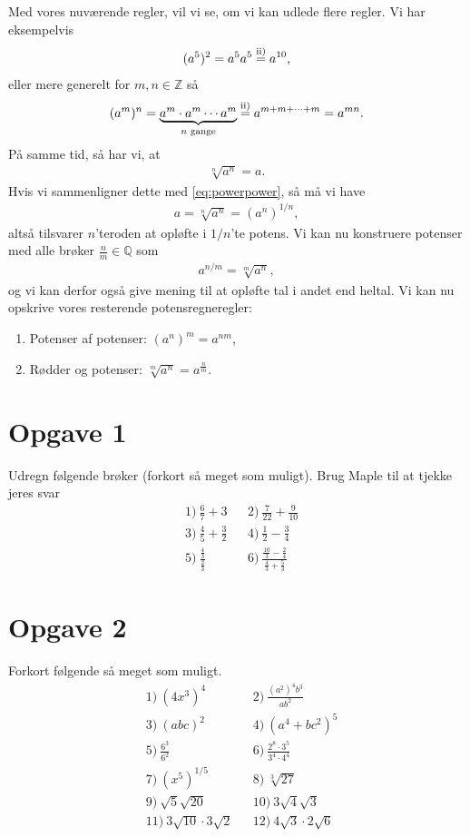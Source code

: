 Med vores nuværende regler, vil vi se, om vi kan udlede flere regler. Vi har eksempelvis
\begin{align*}
(a^5)^2 = a^5a^5 \overset{\textnormal{ii)}}{=} a^{10}, 
\end{align*}
eller mere generelt for $m,n\in \mathbb{Z}$ så
\begin{align}\label{eq:powerpower}
(a^m)^n = \underbrace{a^m\cdot a^m\cdots a^m}_{n \textnormal{ gange}} \overset{\textnormal{ii)}}{=}  a^{m+m+\cdots+m} = a^{mn}.
\end{align}
På samme tid, så har vi, at 
\begin{align*}
\sqrt[n]{a^n} = a. 
\end{align*}
Hvis vi sammenligner dette med \eqref{eq:powerpower}, så må vi have
\begin{align*}
a = \sqrt[n]{a^n} = (a^n)^{1/n},
\end{align*}
altså tilsvarer $n$'teroden at opløfte i $1/n$'te potens. Vi kan nu konstruere potenser med alle brøker $\frac{n}{m}\in \mathbb{Q}$ som
\begin{align*}
a^{n/m} = \sqrt[m]{a^n},
\end{align*}
og vi kan derfor også give mening til at opløfte tal i andet end heltal. 
Vi kan nu opskrive vores resterende potensregneregler:
\begin{enumerate}[label=\roman*)]
\item Potenser af potenser: $(a^n)^m = a^{nm}$,\\
\item Rødder og potenser: $\sqrt[m]{a^n} = a^{\frac{n}{m}}$.
\end{enumerate}
\section*{Opgave 1}
Udregn følgende brøker (forkort så meget som muligt). Brug Maple til at tjekke jeres svar
\begin{align*}
&1)\  \frac{6}{7} + 3              &&2)\ \frac{7}{22} + \frac{9}{10}\\
 &3)\ \frac{4}{5} + \frac{3}{2}      &&4)\ \frac{1}{2} - \frac{3}{4}\\
 &5)\ \frac{\frac{4}{3}}{\frac{2}{3}} &&6)\ \frac{\frac{10}{3}-\frac{2}{4}}{\frac{4}{3}+\frac{5}{3}}
\end{align*}
\section*{Opgave 2}
Forkort følgende så meget som muligt. 
\begin{align*}
&1)\  (4x^3)^4             &&2)\ \frac{(a^2)^4b^3}{ab^2}\\
 &3)\ (abc)^2      &&4)\ (a^4+bc^2)^5\\
 &5)\ \frac{6^3}{6^2} &&6)\ \frac{2^8\cdot 3^5}{3^4\cdot 4^4}\\
 &7)\  (x^5)^{1/5}            &&8)\ \sqrt[3]{27}\\
 &9)\ \sqrt{5}\sqrt{20}      &&10)\ 3\sqrt{4}\sqrt{3}\\
 &11)\ 3\sqrt{10}\cdot3\sqrt{2} &&12)\ 4\sqrt{3}\cdot2\sqrt{6}
\end{align*}